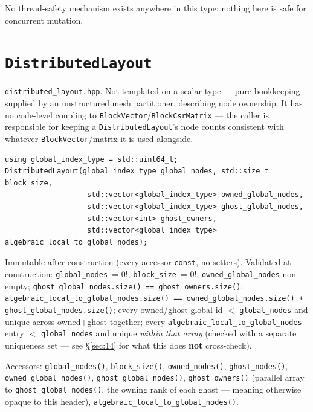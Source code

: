 \documentclass[11pt,a4paper]{report}
\newcommand{\secref}[1]{\S\ref{#1}}
\begin{document}
No thread-safety mechanism exists anywhere in this type; nothing here is
safe for concurrent mutation.

\section{\texorpdfstring{\lstinline!DistributedLayout!}{DistributedLayout}}
\label{sec:3.3}

\texttt{distributed\_layout.hpp}. Not templated on a scalar type --- pure
bookkeeping supplied by an unstructured mesh partitioner, describing node
ownership. It has no code-level coupling to \lstinline!BlockVector!/\lstinline!BlockCsrMatrix!
--- the caller is responsible for keeping a \lstinline!DistributedLayout!'s node
counts consistent with whatever \lstinline!BlockVector!/matrix it is used
alongside.

\begin{lstlisting}
using global_index_type = std::uint64_t;
DistributedLayout(global_index_type global_nodes, std::size_t block_size,
                   std::vector<global_index_type> owned_global_nodes,
                   std::vector<global_index_type> ghost_global_nodes,
                   std::vector<int> ghost_owners,
                   std::vector<global_index_type> algebraic_local_to_global_nodes);
\end{lstlisting}

Immutable after construction (every accessor \lstinline!const!, no setters).
Validated at construction: \lstinline!global_nodes != 0!, \lstinline!block_size != 0!,
\lstinline!owned_global_nodes! non-empty; \lstinline!ghost_global_nodes.size() == ghost_owners.size()!;
\lstinline!algebraic_local_to_global_nodes.size() == owned_global_nodes.size() + ghost_global_nodes.size()!;
every owned/ghost global id $<$ \lstinline!global_nodes! and unique across
owned+ghost together; every \lstinline!algebraic_local_to_global_nodes! entry
$<$ \lstinline!global_nodes! and unique \emph{within that array} (checked with a
separate uniqueness set --- see \secref{sec:14} for what this does
\textbf{not} cross-check).

Accessors: \lstinline!global_nodes()!, \lstinline!block_size()!, \lstinline!owned_nodes()!,
\lstinline!ghost_nodes()!, \lstinline!owned_global_nodes()!, \lstinline!ghost_global_nodes()!,
\lstinline!ghost_owners()! (parallel array to \lstinline!ghost_global_nodes()!, the
owning rank of each ghost --- meaning otherwise opaque to this header),
\lstinline!algebraic_local_to_global_nodes()!.
\end{document}
